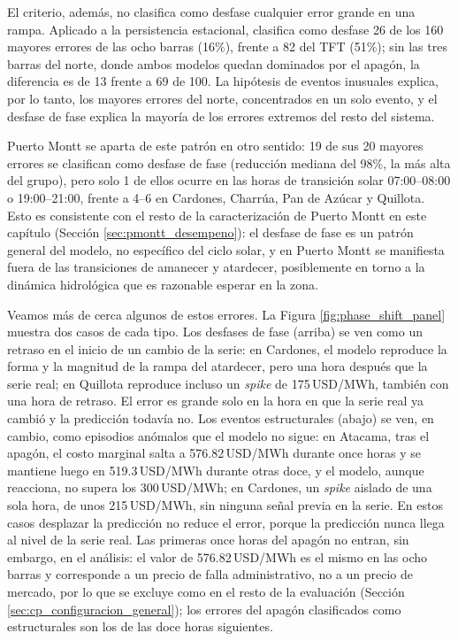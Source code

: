 El criterio, además, no clasifica como desfase cualquier error grande en una rampa. Aplicado a la persistencia estacional, clasifica como desfase 26 de los 160 mayores errores de las ocho barras (16\%), frente a 82 del TFT (51\%); sin las tres barras del norte, donde ambos modelos quedan dominados por el apagón, la diferencia es de 13 frente a 69 de 100. La hipótesis de eventos inusuales explica, por lo tanto, los mayores errores del norte, concentrados en un solo evento, y el desfase de fase explica la mayoría de los errores extremos del resto del sistema.

Puerto Montt se aparta de este patrón en otro sentido: 19 de sus 20 mayores errores se clasifican como desfase de fase (reducción mediana del 98\%, la más alta del grupo), pero solo 1 de ellos ocurre en las horas de transición solar 07:00--08:00 o 19:00--21:00, frente a 4--6 en Cardones, Charrúa, Pan de Azúcar y Quillota. Esto es consistente con el resto de la caracterización de Puerto Montt en este capítulo (Sección \ref{sec:pmontt_desempeno}): el desfase de fase es un patrón general del modelo, no específico del ciclo solar, y en Puerto Montt se manifiesta fuera de las transiciones de amanecer y atardecer, posiblemente en torno a la dinámica hidrológica que es razonable esperar en la zona.

Veamos más de cerca algunos de estos errores. La Figura \ref{fig:phase_shift_panel} muestra dos casos de cada tipo. Los desfases de fase (arriba) se ven como un retraso en el inicio de un cambio de la serie: en Cardones, el modelo reproduce la forma y la magnitud de la rampa del atardecer, pero una hora después que la serie real; en Quillota reproduce incluso un \textit{spike} de 175\,USD/MWh, también con una hora de retraso. El error es grande solo en la hora en que la serie real ya cambió y la predicción todavía no. Los eventos estructurales (abajo) se ven, en cambio, como episodios anómalos que el modelo no sigue: en Atacama, tras el apagón, el costo marginal salta a 576.82\,USD/MWh durante once horas y se mantiene luego en 519.3\,USD/MWh durante otras doce, y el modelo, aunque reacciona, no supera los 300\,USD/MWh; en Cardones, un \textit{spike} aislado de una sola hora, de unos 215\,USD/MWh, sin ninguna señal previa en la serie. En estos casos desplazar la predicción no reduce el error, porque la predicción nunca llega al nivel de la serie real. Las primeras once horas del apagón no entran, sin embargo, en el análisis: el valor de 576.82\,USD/MWh es el mismo en las ocho barras y corresponde a un precio de falla administrativo, no a un precio de mercado, por lo que se excluye como en el resto de la evaluación (Sección \ref{sec:cp_configuracion_general}); los errores del apagón clasificados como estructurales son los de las doce horas siguientes.

